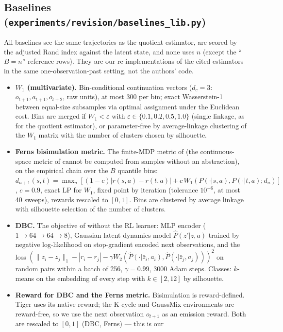 \documentclass[10pt]{article}
\begin{document}
\subsection{Baselines (\texttt{experiments/revision/baselines\_lib.py})}
\label{sec:baseline-details}
All baselines see the same trajectories as the quotient estimator, are scored by
the adjusted Rand index against the latent state, and none uses $n$ (except the
``$B=n$'' reference rows).  They are our re-implementations of the cited
estimators in the same one-observation-past setting, not the authors' code.
\begin{itemize}\small
\item \textbf{$W_1$ (multivariate).}  Bin-conditional continuation vectors
  ($d_c=3$: $o_{t+1},a_{t+1},o_{t+2}$, raw units), at most 300 per bin; exact
  Wasserstein-1 between equal-size subsamples via optimal assignment under the
  Euclidean cost.  Bins are merged if $W_1<\varepsilon$ with
  $\varepsilon\in\{0.1,0.2,0.5,1.0\}$ (single linkage, as for the quotient
  estimator), or parameter-free by average-linkage clustering of the $W_1$
  matrix with the number of clusters chosen by silhouette.
\item \textbf{Ferns bisimulation metric.}  The finite-MDP metric of
  \citet{Ferns2004} (the continuous-space metric of \citet{Ferns2011} cannot be
  computed from samples without an abstraction), on the empirical chain over the
  $B$ quantile bins: $d_{n+1}(s,t)=\max_a[(1-c)|r(s,a)-r(t,a)|+c\,W_1(P(\cdot|s,a),P(\cdot|t,a);d_n)]$,
  $c=0.9$, exact LP for $W_1$, fixed point by iteration (tolerance $10^{-6}$,
  at most 40 sweeps), rewards rescaled to $[0,1]$.  Bins are clustered by
  average linkage with silhouette selection of the number of clusters.
\item \textbf{DBC.}  The objective of \citet{Zhang2020} without the RL learner:
  MLP encoder ($1\to64\to64\to8$), Gaussian latent dynamics model
  $\hat P(z'|z,a)$ trained by negative log-likelihood on stop-gradient encoded
  next observations, and the loss
  $(\|z_i-z_j\|_1-|r_i-r_j|-\gamma W_2(\hat P(\cdot|\bar z_i,a_i),\hat P(\cdot|\bar z_j,a_j)))^2$
  on random pairs within a batch of 256, $\gamma=0.99$, 3000 Adam steps.  Classes:
  $k$-means on the embedding of every step with $k\in[2,12]$ by silhouette.
\item \textbf{Reward for DBC and the Ferns metric.}  Bisimulation is
  reward-defined.  Tiger uses its native reward; the K-cycle and GaussMix
  environments are reward-free, so we use the next observation $o_{t+1}$ as an
  emission reward.  Both are rescaled to $[0,1]$ (DBC, Ferns) --- this is our

\end{itemize}
\end{document}
